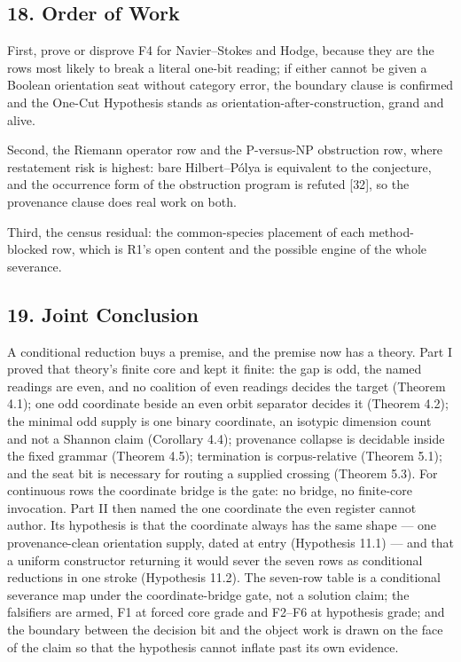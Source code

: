 \documentclass[10pt,twocolumn]{article}
\begin{document}
\subsection{18. Order of Work}\label{order-of-work}

First, prove or disprove F4 for Navier--Stokes and Hodge, because they
are the rows most likely to break a literal one-bit reading; if either
cannot be given a Boolean orientation seat without category error, the
boundary clause is confirmed and the One-Cut Hypothesis stands as
orientation-after-construction, grand and alive.

Second, the Riemann operator row and the P-versus-NP obstruction row,
where restatement risk is highest: bare Hilbert--Pólya is equivalent to
the conjecture, and the occurrence form of the obstruction program is
refuted {[}32{]}, so the provenance clause does real work on both.

Third, the census residual: the common-species placement of each
method-blocked row, which is R1's open content and the possible engine
of the whole severance.

\subsection{19. Joint Conclusion}\label{joint-conclusion}

A conditional reduction buys a premise, and the premise now has a
theory. Part I proved that theory's finite core and kept it finite: the
gap is odd, the named readings are even, and no coalition of even
readings decides the target (Theorem 4.1); one odd coordinate beside an
even orbit separator decides it (Theorem 4.2); the minimal odd supply is
one binary coordinate, an isotypic dimension count and not a Shannon
claim (Corollary 4.4); provenance collapse is decidable inside the fixed
grammar (Theorem 4.5); termination is corpus-relative (Theorem 5.1); and
the seat bit is necessary for routing a supplied crossing (Theorem 5.3).
For continuous rows the coordinate bridge is the gate: no bridge, no
finite-core invocation. Part II then named the one coordinate the even
register cannot author. Its hypothesis is that the coordinate always has
the same shape --- one provenance-clean orientation supply, dated at
entry (Hypothesis 11.1) --- and that a uniform constructor returning it
would sever the seven rows as conditional reductions in one stroke
(Hypothesis 11.2). The seven-row table is a conditional severance map
under the coordinate-bridge gate, not a solution claim; the falsifiers
are armed, F1 at forced core grade and F2--F6 at hypothesis grade; and
the boundary between the decision bit and the object work is drawn on
the face of the claim so that the hypothesis cannot inflate past its own
evidence.
\end{document}
